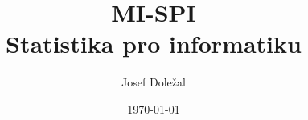 \documentclass[czech]{article}
\author{Josef Doležal}
\date{\today}
\title{MI-SPI\\Statistika pro informatiku}
\newcommand{\lecture}[1]{
    \newpage
    
}
\begin{document}
\maketitle
\newpage

\tableofcontents

\lecture{MI-SPI/01-common-terms}
\lecture{MI-SPI/02-random-variable}
\lecture{MI-SPI/03-random-vectors}
\lecture{MI-SPI/05-entropy}
\lecture{MI-SPI/06-code-theory}
\lecture{MI-SPI/07-differencial-entropy}
\lecture{MI-SPI/08-limits}
\lecture{MI-SPI/09-statistics}
\lecture{MI-SPI/10-hypothesis}
\lecture{MI-SPI/11-hypothesis-2}
\lecture{MI-SPI/13-histograms}
\lecture{MI-SPI/14-random-processes}
\lecture{MI-SPI/15-random-processes-construction}
\end{document}
